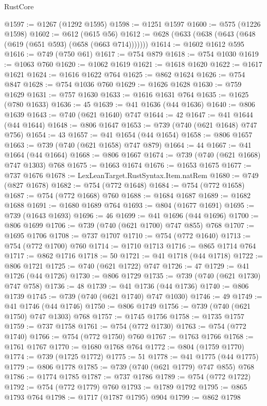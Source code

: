 \begin{lexlean}{RustCore}
\begin{coremodule}
@1597 := @1267 (@1292 @1595)
@1598 := @1251 @1597
@1600 := @575 (@1226 @1598)
@1602 := @612 (@615 @56)
@1612 := @628 (@633 (@638 (@643 (@648 (@619 (@651 @593) (@658 (@663 @714)))))))
@1614 := @1602 @1612 @595
@1616 := @749 (@750 @61)
@1617 := @754 @879
@1618 := @754 @1030
@1619 := @1063 @760
@1620 := @1062 @1619
@1621 := @1618 @1620
@1622 := @1617 @1621
@1624 := @1616 @1622 @764
@1625 := @862 @1624
@1626 := @754 @847
@1628 := @754 @1036 @760
@1629 := @1626 @1628
@1630 := @759 @1629
@1631 := @757 @1630
@1633 := @1616 @1631 @764
@1635 := @1625 (@780 @1633)
@1636 := 45
@1639 := @41 @1636 (@44 @1636)
@1640 := @806 @1639
@1643 := @740 (@621 @1640) @747
@1644 := 42
@1647 := @41 @1644 (@44 @1644)
@1648 := @806 @1647
@1653 := @739 (@740 (@621 @1648) @747 @756)
@1654 := 43
@1657 := @41 @1654 (@44 @1654)
@1658 := @806 @1657
@1663 := @739 (@740 (@621 @1658) @747 @879)
@1664 := 44
@1667 := @41 @1664 (@44 @1664)
@1668 := @806 @1667
@1674 := @739 (@740 (@621 @1668) @747 @1303) @768
@1675 := @1663 @1674
@1676 := @1653 @1675
@1677 := @737 @1676
@1678 := LexLeanTarget.RustSyntax.Item.natRem
@1680 := @749 (@827 @1678)
@1682 := @754 (@772 @1648)
@1684 := @754 (@772 @1658)
@1687 := @754 (@772 @1668) @760
@1688 := @1684 @1687
@1689 := @1682 @1688
@1691 := @1680 @1689 @764
@1693 := @804 (@1677 @1691)
@1695 := @739 (@1643 @1693)
@1696 := 46
@1699 := @41 @1696 (@44 @1696)
@1700 := @806 @1699
@1706 := @739 (@740 (@621 @1700) @747 @855) @768
@1707 := @1695 @1706
@1708 := @737 @1707
@1710 := @754 (@772 @1640)
@1713 := @754 (@772 @1700) @760
@1714 := @1710 @1713
@1716 := @865 @1714 @764
@1717 := @862 @1716
@1718 := 50
@1721 := @41 @1718 (@44 @1718)
@1722 := @806 @1721
@1725 := @740 (@621 @1722) @747
@1726 := 47
@1729 := @41 @1726 (@44 @1726)
@1730 := @806 @1729
@1735 := @739 (@740 (@621 @1730) @747 @758)
@1736 := 48
@1739 := @41 @1736 (@44 @1736)
@1740 := @806 @1739
@1745 := @739 (@740 (@621 @1740) @747 @1030)
@1746 := 49
@1749 := @41 @1746 (@44 @1746)
@1750 := @806 @1749
@1756 := @739 (@740 (@621 @1750) @747 @1303) @768
@1757 := @1745 @1756
@1758 := @1735 @1757
@1759 := @737 @1758
@1761 := @754 (@772 @1730)
@1763 := @754 (@772 @1740)
@1766 := @754 (@772 @1750) @760
@1767 := @1763 @1766
@1768 := @1761 @1767
@1770 := @1680 @1768 @764
@1772 := @804 (@1759 @1770)
@1774 := @739 (@1725 @1772)
@1775 := 51
@1778 := @41 @1775 (@44 @1775)
@1779 := @806 @1778
@1785 := @739 (@740 (@621 @1779) @747 @855) @768
@1786 := @1774 @1785
@1787 := @737 @1786
@1789 := @754 (@772 @1722)
@1792 := @754 (@772 @1779) @760
@1793 := @1789 @1792
@1795 := @865 @1793 @764
@1798 := @1717 (@1787 @1795) @904
@1799 := @862 @1798

\end{coremodule}
\end{lexlean}

